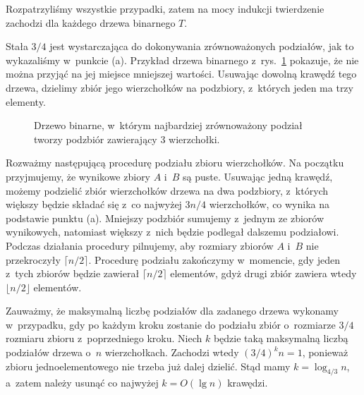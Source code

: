 Rozpatrzyliśmy wszystkie przypadki, zatem na mocy indukcji twierdzenie zachodzi dla każdego drzewa binarnego $T$.

\subproblem %
Stała $3/4$ jest wystarczająca do dokonywania zrównoważonych podziałów, jak to wykazaliśmy w~punkcie (a).
Przykład drzewa binarnego z~rys.\ \ref{fig:B-3b} pokazuje, że nie można przyjąć na jej miejsce mniejszej wartości.
Usuwając dowolną krawędź tego drzewa, dzielimy zbiór jego wierzchołków na podzbiory, z~których jeden ma trzy elementy.
\begin{figure}[ht]
	\centering 
	\caption{Drzewo binarne, w~którym najbardziej zrównoważony podział tworzy podzbiór zawierający 3 wierzchołki.} \label{fig:B-3b}
\end{figure}

\subproblem %
Rozważmy następującą procedurę podziału zbioru wierzchołków.
Na początku przyjmujemy, że wynikowe zbiory $A$ i~$B$ są puste.
Usuwając jedną krawędź, możemy podzielić  zbiór wierzchołków drzewa na dwa podzbiory, z~których większy będzie składać się z~co najwyżej $3n/4$ wierzchołków, co wynika na podstawie punktu (a).
Mniejszy podzbiór sumujemy z~jednym ze zbiorów wynikowych, natomiast większy z~nich będzie podlegał dalszemu podziałowi.
Podczas działania procedury pilnujemy, aby rozmiary zbiorów $A$ i~$B$ nie przekroczyły $\lceil n/2\rceil$.
Procedurę podziału zakończymy w~momencie, gdy jeden z~tych zbiorów będzie zawierał $\lceil n/2\rceil$ elementów, gdyż drugi zbiór zawiera wtedy $\lfloor n/2\rfloor$ elementów.

Zauważmy, że maksymalną liczbę podziałów dla zadanego drzewa wykonamy w~przypadku, gdy po każdym kroku zostanie do podziału zbiór o~rozmiarze $3/4$ rozmiaru zbioru z~poprzedniego kroku.
Niech $k$ będzie taką maksymalną liczbą podziałów drzewa o~$n$ wierzchołkach.
Zachodzi wtedy $(3/4)^kn=1$, ponieważ zbioru jednoelementowego nie trzeba już dalej dzielić.
Stąd mamy $k=\log_{4/3}n$, a~zatem należy usunąć co najwyżej $k=O(\lg n)$ krawędzi.
